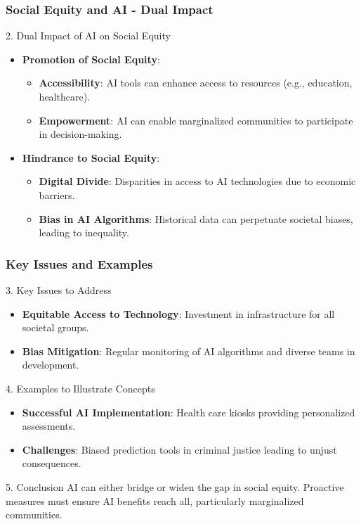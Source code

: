 \documentclass[aspectratio=169]{beamer}
\begin{document}
\begin{frame}[fragile]
    \frametitle{Social Equity and AI - Dual Impact}
    \begin{block}{2. Dual Impact of AI on Social Equity}
        \begin{itemize}
            \item \textbf{Promotion of Social Equity}:
                \begin{itemize}
                    \item \textbf{Accessibility}: AI tools can enhance access to resources (e.g., education, healthcare).
                    \item \textbf{Empowerment}: AI can enable marginalized communities to participate in decision-making.
                \end{itemize}

            \item \textbf{Hindrance to Social Equity}:
                \begin{itemize}
                    \item \textbf{Digital Divide}: Disparities in access to AI technologies due to economic barriers.
                    \item \textbf{Bias in AI Algorithms}: Historical data can perpetuate societal biases, leading to inequality.
                \end{itemize}
        \end{itemize}
    \end{block}
\end{frame}

\begin{frame}[fragile]
    \frametitle{Key Issues and Examples}
    \begin{block}{3. Key Issues to Address}
        \begin{itemize}
            \item \textbf{Equitable Access to Technology}: Investment in infrastructure for all societal groups.
            \item \textbf{Bias Mitigation}: Regular monitoring of AI algorithms and diverse teams in development.
        \end{itemize}
    \end{block}
    
    \begin{block}{4. Examples to Illustrate Concepts}
        \begin{itemize}
            \item \textbf{Successful AI Implementation}: Health care kiosks providing personalized assessments.
            \item \textbf{Challenges}: Biased prediction tools in criminal justice leading to unjust consequences.
        \end{itemize}
    \end{block}
    
    \begin{block}{5. Conclusion}
        \small
        AI can either bridge or widen the gap in social equity. Proactive measures must ensure AI benefits reach all, particularly marginalized communities.
    \end{block}
\end{frame}
\end{document}
